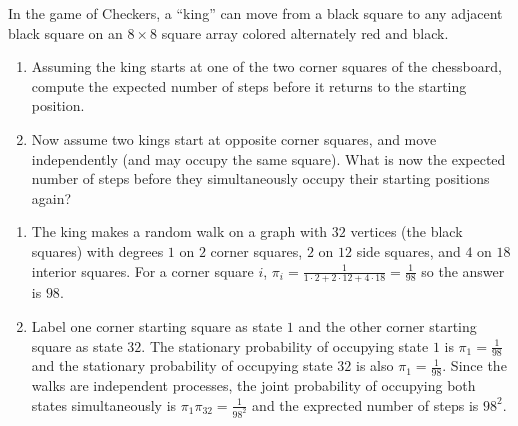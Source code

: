\documentclass[12pt]{article}
\begin{document}
\begin{exercises}
\begin{exercise}
    In the game of Checkers, a ``king'' can move from a black square to
    any adjacent black square on an \( 8 \times 8 \) square array
    colored alternately red and black.
    \begin{enumerate}[label=(\alph*)]
    \item
        Assuming the king starts at one of the two corner squares of the
        chessboard, compute the expected number of steps before it
        returns to the starting position.
    \item
        Now assume two kings start at opposite corner squares, and move
        independently (and may occupy the same square).  What is now the
        expected number of steps before they simultaneously occupy their
        starting positions again?
\end{enumerate}
\end{exercise}
\begin{solution}
    \begin{enumerate}[label=(\alph*)]
    \item
        The king makes a random walk on a graph with \( 32 \) vertices (the
        black squares) with degrees \( 1 \) on \( 2 \) corner squares, \(
        2 \) on \( 12 \) side squares, and \( 4 \) on \( 18 \) interior
        squares.  For a corner square \( i \), \( \pi_i = \frac{1}{1
        \cdot 2+ 2 \cdot 12 + 4 \cdot 18} = \frac{1}{98} \) so the
        answer is \( 98 \).
      \item
        Label one corner starting square as state \( 1 \) and the
        other corner starting square as state \( 32 \).  The
        stationary probability of occupying state \( 1 \) is \(
        \pi_{1} = \frac{1}{98} \) and the stationary probability of occupying state
        \( 32 \) is also \( \pi_{1} = \frac{1}{98} \).
        Since the walks are independent processes, the joint
        probability of occupying both states simultaneously is \(
        \pi_1 \pi_{32} = \frac{1}{98^{2}} \) and the exprected number of steps
        is \( 98^2 \).
\end{enumerate}
\end{solution}


\end{exercises}
\end{document}
